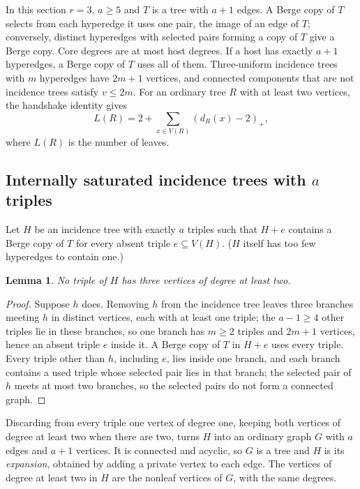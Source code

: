 \documentclass[11pt]{article}
\newtheorem{lemma}[theorem]{Lemma}
\theoremstyle{definition}
\theoremstyle{remark}
\begin{document}
In this section $r=3$, $a\ge5$ and $T$ is a tree with $a+1$ edges. A Berge
copy of $T$ selects from each hyperedge it uses one pair, the image of an
edge of $T$; conversely, distinct hyperedges with selected pairs forming a
copy of $T$ give a Berge copy. Core degrees are at most host degrees. If a
host has exactly $a+1$ hyperedges, a Berge copy of $T$ uses all of them.
Three-uniform incidence trees with $m$ hyperedges have $2m+1$ vertices, and
connected components that are not incidence trees satisfy $v\le2m$. For an
ordinary tree $R$ with at least two vertices, the handshake identity gives
\begin{equation}\label{eq:leaves}
L(R)=2+\sum_{x\in V(R)}(d_R(x)-2)_+ ,
\end{equation}
where $L(R)$ is the number of leaves.

\subsection{\texorpdfstring{Internally saturated incidence trees with $a$ triples}{Internally saturated incidence trees with a triples}}

Let $H$ be an incidence tree with exactly $a$ triples such that $H+e$
contains a Berge copy of $T$ for every absent triple $e\subseteq V(H)$.
($H$ itself has too few hyperedges to contain one.)

\begin{lemma}\label{lem:three}
No triple of $H$ has three vertices of degree at least two.
\end{lemma}

\begin{proof}
Suppose $h$ does. Removing $h$ from the incidence tree leaves three branches
meeting $h$ in distinct vertices, each with at least one triple; the $a-1\ge4$
other triples lie in these branches, so one branch has $m\ge2$ triples and
$2m+1$ vertices, hence an absent triple $e$ inside it. A Berge copy of $T$
in $H+e$ uses every triple. Every triple other than $h$, including $e$, lies
inside one branch, and each branch contains a used triple whose selected
pair lies in that branch; the selected pair of $h$ meets at most two
branches, so the selected pairs do not form a connected graph.
\end{proof}

Discarding from every triple one vertex of degree one, keeping both
vertices of degree at least two when there are two, turns $H$ into an
ordinary graph $G$ with $a$ edges and $a+1$ vertices. It is connected and
acyclic, so $G$ is a tree and $H$ is its \emph{expansion}, obtained by adding
a private vertex to each edge. The vertices of degree at least two in $H$
are the nonleaf vertices of $G$, with the same degrees.
\end{document}
